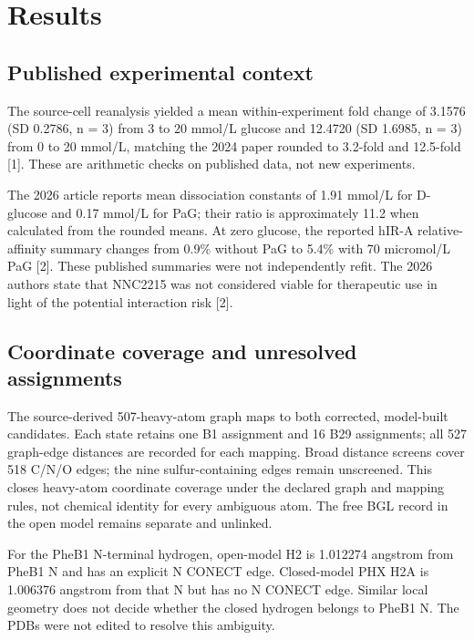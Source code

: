 \documentclass[11pt]{article}
\begin{document}
\section{Results}

\subsection{Published experimental context}

The source-cell reanalysis yielded a mean within-experiment fold change of 3.1576 (SD 0.2786, n = 3) from 3 to 20 mmol/L glucose and 12.4720 (SD 1.6985, n = 3) from 0 to 20 mmol/L, matching the 2024 paper rounded to 3.2-fold and 12.5-fold [1]. These are arithmetic checks on published data, not new experiments.

The 2026 article reports mean dissociation constants of 1.91 mmol/L for D-glucose and 0.17 mmol/L for PaG; their ratio is approximately 11.2 when calculated from the rounded means. At zero glucose, the reported hIR-A relative-affinity summary changes from 0.9\% without PaG to 5.4\% with 70 micromol/L PaG [2]. These published summaries were not independently refit. The 2026 authors state that NNC2215 was not considered viable for therapeutic use in light of the potential interaction risk [2].

\subsection{Coordinate coverage and unresolved assignments}

The source-derived 507-heavy-atom graph maps to both corrected, model-built candidates. Each state retains one B1 assignment and 16 B29 assignments; all 527 graph-edge distances are recorded for each mapping. Broad distance screens cover 518 C/N/O edges; the nine sulfur-containing edges remain unscreened. This closes heavy-atom coordinate coverage under the declared graph and mapping rules, not chemical identity for every ambiguous atom. The free BGL record in the open model remains separate and unlinked.

For the PheB1 N-terminal hydrogen, open-model H2 is 1.012274 angstrom from PheB1 N and has an explicit N CONECT edge. Closed-model PHX H2A is 1.006376 angstrom from that N but has no N CONECT edge. Similar local geometry does not decide whether the closed hydrogen belongs to PheB1 N. The PDBs were not edited to resolve this ambiguity.
\end{document}
